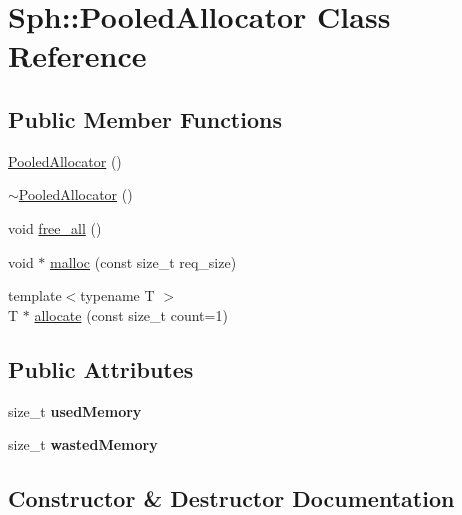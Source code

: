 \hypertarget{classSph_1_1PooledAllocator}{}\section{Sph\+:\+:Pooled\+Allocator Class Reference}
\label{classSph_1_1PooledAllocator}
\subsection*{Public Member Functions}
\begin{DoxyCompactItemize}
\item 
\hyperlink{classSph_1_1PooledAllocator_a88e0fa5e5936ff3b8041dd219de17553}{Pooled\+Allocator} ()
\item 
\hyperlink{classSph_1_1PooledAllocator_a4a29f040cee13bd4a118bd31d762c8fb}{$\sim$\+Pooled\+Allocator} ()
\item 
void \hyperlink{classSph_1_1PooledAllocator_aba832ee65b680cd0b128471fedc749df}{free\+\_\+all} ()
\item 
void $\ast$ \hyperlink{classSph_1_1PooledAllocator_a9a9976d06e621b3f2815538c01c1ca26}{malloc} (const size\+\_\+t req\+\_\+size)
\item 
{\footnotesize template$<$typename T $>$ }\\T $\ast$ \hyperlink{classSph_1_1PooledAllocator_a7c9d02c5d34a4e6cb0393d78a978c56f}{allocate} (const size\+\_\+t count=1)
\end{DoxyCompactItemize}
\subsection*{Public Attributes}
\begin{DoxyCompactItemize}
\item 
\hypertarget{classSph_1_1PooledAllocator_a56bbf2a5148e2fafe16fe0429cde7d81}{}\label{classSph_1_1PooledAllocator_a56bbf2a5148e2fafe16fe0429cde7d81} 
size\+\_\+t {\bfseries used\+Memory}
\item 
\hypertarget{classSph_1_1PooledAllocator_af1a82cde8e5659734fde3ada52e3f9dc}{}\label{classSph_1_1PooledAllocator_af1a82cde8e5659734fde3ada52e3f9dc} 
size\+\_\+t {\bfseries wasted\+Memory}
\end{DoxyCompactItemize}


\subsection{Constructor \& Destructor Documentation}
\hypertarget{classSph_1_1PooledAllocator_a88e0fa5e5936ff3b8041dd219de17553}{}\label{classSph_1_1PooledAllocator_a88e0fa5e5936ff3b8041dd219de17553} 
